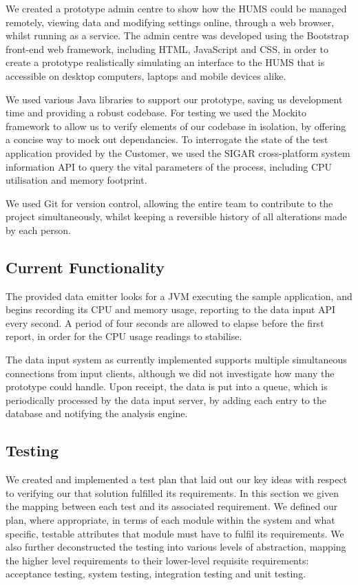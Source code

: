 \documentclass[10pt,a4paper]{article}
\begin{document}
We created a prototype admin centre to show how the HUMS could be
managed remotely, viewing data and modifying settings online, through
a web browser, whilst running as a service. The admin centre was
developed using the Bootstrap front-end web framework, including 
HTML, JavaScript and CSS, in order to create a prototype realistically
simulating an interface to the HUMS that is accessible on desktop
computers, laptops and mobile devices alike.


We used various Java libraries to support our prototype, saving us 
development time and providing a robust codebase. For testing we used 
the Mockito framework to allow us to verify elements of our codebase in 
isolation, by offering a concise way to mock out dependancies. To 
interrogate the state of the test application provided by the Customer, we 
used the SIGAR cross-platform system information API to query the vital 
parameters of the process, including CPU utilisation and memory 
footprint.

We used Git for version control, allowing the entire team to
contribute to the project simultaneously, whilst keeping a reversible
history of all alterations made by each person.

\subsection{Current Functionality}

The provided data emitter looks for a JVM executing the sample application, and
begins recording its CPU and memory usage, reporting to the data input API
every second. A period of four seconds are allowed to elapse before the first
report, in order for the CPU usage readings to stabilise.

The data input system as currently implemented supports multiple simultaneous
connections from input clients, although we did not investigate how many the
prototype could handle. Upon receipt, the data is put into a queue, which is
periodically processed by the data input server, by adding each entry to the
database and notifying the analysis engine.

\subsection{Testing} 
We created and implemented a test plan that laid out our key ideas
with respect to verifying our that solution fulfilled its
requirements. In this section we given the mapping between each
test and its associated requirement. We
defined our plan, where appropriate, in terms of each module within
the system and what specific, testable attributes that module must
have to fulfil its requirements. We also further deconstructed the
testing into various levels of abstraction, mapping the higher level
requirements to their lower-level requisite requirements: acceptance
testing, system testing, integration testing and unit
testing.
\end{document}
